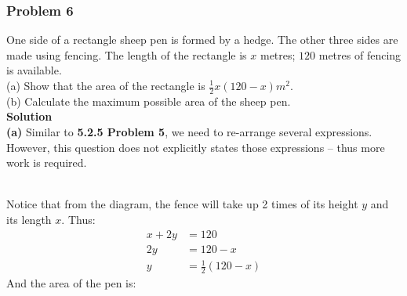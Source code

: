 \documentclass[hidelinks, a4paper, 12pt]{article}
\newcommand{\bd}{\textbf}
\newcommand{\n}{\\[\baselineskip]}
\begin{document}
            \subsubsection{Problem 6}
                One side of a rectangle sheep pen is formed by a hedge. The other three sides are made using fencing.
                The length of the rectangle is $x$ metres; $120$ metres of fencing is available.\n
                (a) Show that the area of the rectangle is $\frac{1}{2}x(120-x)m^2$.\n
                (b) Calculate the maximum possible area of the sheep pen.\n
                \bd{Solution}\n
                \bd{(a)} Similar to \bd{5.2.5 Problem 5}, we need to re-arrange several expressions. However, this question
                does not explicitly states those expressions -- thus more work is required.\n       
                \n
                Notice that from the diagram, the fence will take up 2 times of its height $y$ and its length $x$. Thus:
                \[\begin{split}
                    x + 2y &= 120\\
                    2y &= 120 - x\\
                    y &= \frac{1}{2}(120-x)
                \end{split}\] 
                And the area of the pen is:
\end{document}
